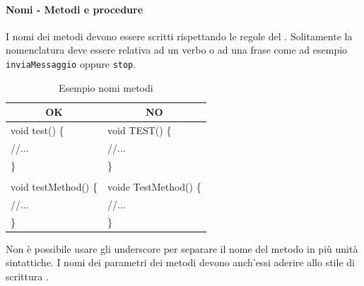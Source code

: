 \paragraph{Nomi - Metodi e procedure} I nomi dei metodi devono essere scritti rispettando le regole del . Solitamente la nomenclatura deve essere relativa ad un verbo o ad una frase come ad esempio \texttt{inviaMessaggio} oppure \texttt{stop}.
\begin{table} [H]
	\begin{center}
		\begin{tabular}{ | l | l |}
			\multicolumn{1}{c}{\textbf{OK}}&\multicolumn{1}{c}{\textbf{NO}}\\ 
			\hline
			void test() \{& void TEST() \{\\
			\hspace{0.5cm} //... & \hspace{0.5cm} //...\\
			\}&\}\\
			&\\
			void testMethod() \{ & voide TestMethod() \{ \\
			\hspace{0.5cm} //... & \hspace{0.5cm} //... \\
			\}&\}\\
			\hline
		\end{tabular}
	\end{center}
	\caption{Esempio nomi metodi}
\end{table}
Non è possibile usare gli underscore per separare il nome del metodo in più unità sintattiche. I nomi dei parametri dei metodi devono anch’essi aderire allo stile di scrittura .
